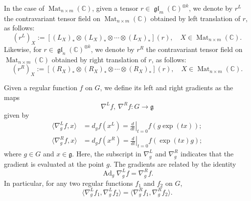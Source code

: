 \documentclass[11pt]{article}
\DeclareMathOperator{\Ad}{Ad}
\DeclareMathOperator{\gl}{\mathfrak{gl}}
\DeclareMathOperator{\Mat}{Mat}
\theoremstyle{definition}\newtheorem{definition}[theorem]{Definition}
\theoremstyle{definition}\newtheorem{remark}[theorem]{Remark}
\theoremstyle{remark}
\numberwithin{equation}{section}
\begin{document}
In the case of $\Mat_{n\times m}(\mathbb{C})$, given a tensor $r \in \gl_m(\mathbb{C})^{\otimes k}$, we denote by $r^L$ the contravariant tensor field on $\Mat_{n\times m}(\mathbb{C})$ obtained by left translation of $r$, as follows:
\begin{equation*}
    (r^L)_X:=[(L_X)_* \otimes (L_X)_* \otimes \cdots \otimes (L_X)_*](r), \quad X \in \Mat_{n\times m}(\mathbb{C}).
\end{equation*}
Likewise, for $r \in \gl_n(\mathbb{C})^{\otimes k}$, we denote by $r^R$ the contravariant tensor field on $\Mat_{n\times m}(\mathbb{C})$ obtained by right translation of $r$, as follows:
\begin{equation*}
    (r^R)_X:=[(R_X)_* \otimes (R_X)_* \otimes \cdots \otimes (R_X)_*](r), \quad X \in \Mat_{n\times m}(\mathbb{C}).
\end{equation*}

Given a regular function $f$ on $G$, we define its left and right gradients as the maps
\begin{equation*}
    \nabla^L f,\ \nabla^R f : G \rightarrow \mathfrak{g}
\end{equation*}
given by
\begin{align*}
    \langle \nabla^L_gf,x\rangle  &= d_gf(x^L) = \left.\frac{d}{dt}\right|_{t=0} f(g\exp(tx));\\
    \langle \nabla^R_g f,x\rangle &= d_gf(x^R) = \left.\frac{d}{dt}\right|_{t=0} f(\exp(tx)g);
\end{align*}
where $g \in G$ and $x \in \mathfrak{g}$. Here, the subscript in $\nabla^L_g$ and $\nabla^R_g$ indicates that the gradient is evaluated at the point $g$. The gradients are related by the identity
\begin{equation*}
    \Ad_g \nabla^L_g f = \nabla_g^R f.
\end{equation*}
In particular, for any two regular functions $f_1$ and $f_2$ on $G$,
\begin{equation*}
    \langle \nabla^L_g f_1,\nabla^L_g f_2\rangle = \langle \nabla^R_g f_1,\nabla^R_g f_2\rangle.
\end{equation*}
\end{document}
